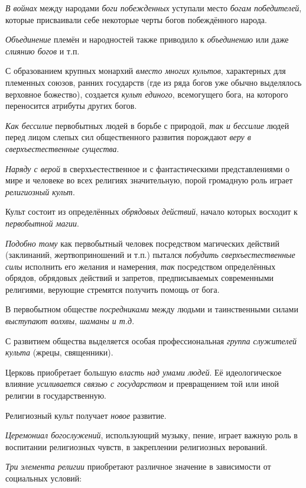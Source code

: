 \documentclass[a4paper,14pt,russian]{extreport}
\begin{document}
\emph{В войнах} между народами \emph{боги побежденных} уступали место \emph{богам победителей}, которые присваивали себе некоторые черты богов побеждённого народа.

\emph{Объединение} племён и народностей также приводило к \emph{объединению} или даже \emph{слиянию богов} и т.п.

С образованием крупных монархий \emph{вместо многих культов}, характерных для племенных союзов, ранних государств (где из ряда богов уже обычно выделялось верховное божество), создается \emph{культ единого}, всемогущего бога, на которого переносится атрибуты других богов.

\emph{Как бессилие} первобытных людей в борьбе с природой, \emph{так и бессилие} людей перед лицом слепых сил общественного развития порождают \emph{веру в сверхъестественные существа}.

\emph{Наряду с верой} в сверхъестественное и с фантастическими представлениями о мире и человеке во всех религиях значительную, порой громадную роль играет \emph{религиозный культ}.

Культ состоит из определённых \emph{обрядовых действий}, начало которых восходит к \emph{первобытной магии}.

\emph{Подобно тому} как первобытный человек посредством магических действий (заклинаний, жертвоприношений и т.п.) пытался \emph{побудить сверхъестественные силы} исполнить его желания и намерения, \emph{так} посредством определённых обрядов, обрядовых действий и запретов, предписываемых современными религиями, верующие стремятся получить помощь от бога.

В первобытном обществе \emph{посредниками} между людьми и таинственными силами \emph{выступают волхвы}, \emph{шаманы и т.д}.

С развитием общества выделяется особая профессиональная \emph{группа служителей культа} (жрецы, священники).

Церковь приобретает большую \emph{власть над умами людей}. Её идеологическое влияние \emph{усиливается связью с государством} и превращением той или иной религии в государственную.

Религиозный культ получает \emph{новое} развитие.

\emph{Церемониал богослужений}, использующий музыку, пение, играет важную роль в воспитании религиозных чувств, в закреплении религиозных верований.

\emph{Три} \emph{элемента религии} приобретают различное значение в зависимости от социальных условий:
\end{document}
